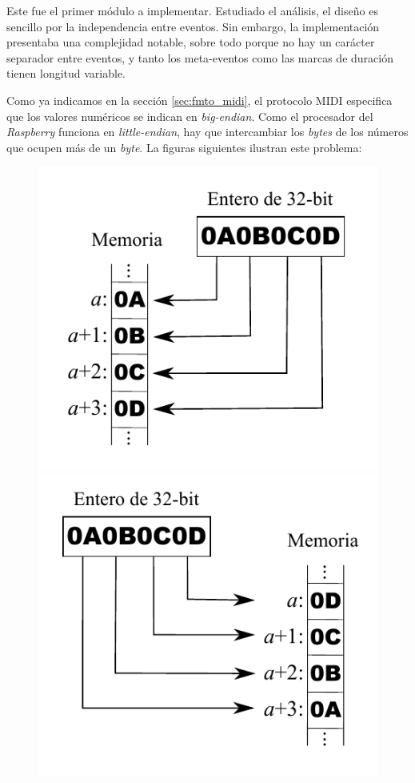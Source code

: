 Este fue el primer módulo a implementar. Estudiado el análisis, el diseño es sencillo por la independencia entre eventos. Sin embargo, la implementación presentaba una complejidad notable, sobre todo porque no hay un carácter separador entre eventos, y tanto los meta-eventos como las marcas de duración tienen longitud variable.

Como ya indicamos en la sección \ref{sec:fmto_midi}, el protocolo \acrshort{MIDI} especifica que los valores numéricos se indican en \textit{big-endian}. Como el procesador del \textit{Raspberry} funciona en \textit{little-endian}, hay que intercambiar los \textit{bytes} de los números que ocupen más de un \textit{byte}. La figuras siguientes ilustran este problema:

\smallskip

\begin{figure}[H]
	\noindent \begin{centering}
		\includegraphics[width=\linewidth/3]{capitulo5/big_endian}
		\includegraphics[width=\linewidth/3]{capitulo5/little_endian}

\end{centering}
\end{figure}
